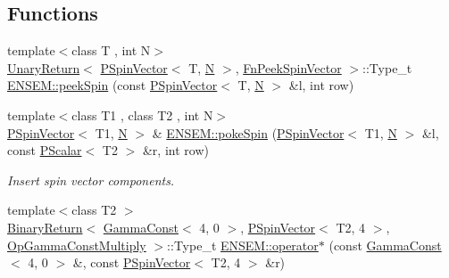 \subsection*{Functions}
\begin{DoxyCompactItemize}
\item 
{\footnotesize template$<$class T , int N$>$ }\\\mbox{\hyperlink{structENSEM_1_1UnaryReturn}{Unary\+Return}}$<$ \mbox{\hyperlink{classENSEM_1_1PSpinVector}{P\+Spin\+Vector}}$<$ T, \mbox{\hyperlink{operator__name__util_8cc_a7722c8ecbb62d99aee7ce68b1752f337}{N}} $>$, \mbox{\hyperlink{structENSEM_1_1FnPeekSpinVector}{Fn\+Peek\+Spin\+Vector}} $>$\+::Type\+\_\+t \mbox{\hyperlink{group__primspinvector_gad13d4acbc90e4d69a8528585ad1c35c8}{E\+N\+S\+E\+M\+::peek\+Spin}} (const \mbox{\hyperlink{classENSEM_1_1PSpinVector}{P\+Spin\+Vector}}$<$ T, \mbox{\hyperlink{operator__name__util_8cc_a7722c8ecbb62d99aee7ce68b1752f337}{N}} $>$ \&l, int row)
\item 
{\footnotesize template$<$class T1 , class T2 , int N$>$ }\\\mbox{\hyperlink{classENSEM_1_1PSpinVector}{P\+Spin\+Vector}}$<$ T1, \mbox{\hyperlink{operator__name__util_8cc_a7722c8ecbb62d99aee7ce68b1752f337}{N}} $>$ \& \mbox{\hyperlink{group__primspinvector_ga55ef7594c5803a6f510d30a63e5aab4b}{E\+N\+S\+E\+M\+::poke\+Spin}} (\mbox{\hyperlink{classENSEM_1_1PSpinVector}{P\+Spin\+Vector}}$<$ T1, \mbox{\hyperlink{operator__name__util_8cc_a7722c8ecbb62d99aee7ce68b1752f337}{N}} $>$ \&l, const \mbox{\hyperlink{classENSEM_1_1PScalar}{P\+Scalar}}$<$ T2 $>$ \&r, int row)
\begin{DoxyCompactList}\small\item\em Insert spin vector components. \end{DoxyCompactList}\item 
{\footnotesize template$<$class T2 $>$ }\\\mbox{\hyperlink{structENSEM_1_1BinaryReturn}{Binary\+Return}}$<$ \mbox{\hyperlink{classENSEM_1_1GammaConst}{Gamma\+Const}}$<$ 4, 0 $>$, \mbox{\hyperlink{classENSEM_1_1PSpinVector}{P\+Spin\+Vector}}$<$ T2, 4 $>$, \mbox{\hyperlink{structENSEM_1_1OpGammaConstMultiply}{Op\+Gamma\+Const\+Multiply}} $>$\+::Type\+\_\+t \mbox{\hyperlink{group__primspinvector_ga78eeeb22b735ad934f6d55320f04be68}{E\+N\+S\+E\+M\+::operator$\ast$}} (const \mbox{\hyperlink{classENSEM_1_1GammaConst}{Gamma\+Const}}$<$ 4, 0 $>$ \&, const \mbox{\hyperlink{classENSEM_1_1PSpinVector}{P\+Spin\+Vector}}$<$ T2, 4 $>$ \&r)
\item 

\end{DoxyCompactItemize}
